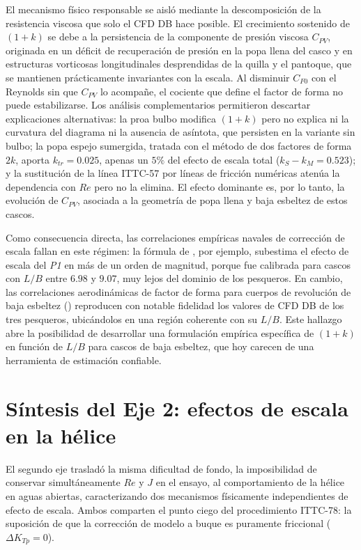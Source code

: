 El mecanismo físico responsable se aisló mediante la descomposición de la
resistencia viscosa que solo el CFD DB hace posible. El crecimiento sostenido de
$(1+k)$ se debe a la persistencia de la componente de presión viscosa $C_{PV}$,
originada en un déficit de recuperación de presión en la popa llena del casco y en
estructuras vorticosas longitudinales desprendidas de la quilla y el pantoque, que
se mantienen prácticamente invariantes con la escala. Al disminuir $C_{F0}$ con el
Reynolds sin que $C_{PV}$ lo acompañe, el cociente que define el factor de forma no
puede estabilizarse. Los análisis complementarios permitieron descartar
explicaciones alternativas: la proa bulbo modifica $(1+k)$ pero no explica ni la
curvatura del diagrama ni la ausencia de asíntota, que persisten en la variante sin
bulbo; la popa espejo sumergida, tratada con el método de dos factores de forma
$2k$, aporta $k_{tr} = 0{.}025$, apenas un $5\%$ del efecto de escala total
($k_S - k_M = 0{.}523$); y la sustitución de la línea ITTC-57 por líneas de fricción
numéricas atenúa la dependencia con $Re$ pero no la elimina. El efecto dominante es,
por lo tanto, la evolución de $C_{PV}$, asociada a la geometría de popa llena y baja
esbeltez de estos cascos.

Como consecuencia directa, las correlaciones empíricas navales de corrección de
escala fallan en este régimen: la fórmula de \citet{gomezgarcia}, por ejemplo,
subestima el efecto de escala del \textit{P1} en más de un orden de magnitud,
porque fue calibrada para cascos con $L/B$ entre $6{.}98$ y $9{.}07$, muy lejos del
dominio de los pesqueros. En cambio, las correlaciones aerodinámicas de factor de
forma para cuerpos de revolución de baja esbeltez (\citealp{raymer2019aircraft,
roskam1987airplane}) reproducen con notable fidelidad los valores de CFD DB de los
tres pesqueros, ubicándolos en una región coherente con su $L/B$. Este hallazgo
abre la posibilidad de desarrollar una formulación empírica específica de $(1+k)$
en función de $L/B$ para cascos de baja esbeltez, que hoy carecen de una
herramienta de estimación confiable.

\section{Síntesis del Eje 2: efectos de escala en la hélice}

El segundo eje trasladó la misma dificultad de fondo, la imposibilidad de conservar
simultáneamente $Re$ y $J$ en el ensayo, al comportamiento de la hélice en aguas
abiertas, caracterizando dos mecanismos físicamente independientes de efecto de
escala. Ambos comparten el punto ciego del procedimiento ITTC-78: la suposición de
que la corrección de modelo a buque es puramente friccional ($\Delta K_{Tp} = 0$).

